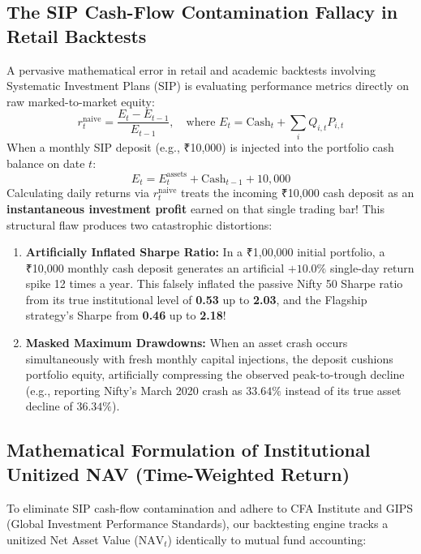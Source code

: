 \documentclass[11pt,a4paper]{article}
\begin{document}
\subsection{The SIP Cash-Flow Contamination Fallacy in Retail Backtests}
A pervasive mathematical error in retail and academic backtests involving Systematic Investment Plans (SIP) is evaluating performance metrics directly on raw marked-to-market equity:
\begin{equation}
r_t^{\text{naive}} = \frac{E_t - E_{t-1}}{E_{t-1}}, \quad \text{where } E_t = \text{Cash}_t + \sum_{i} Q_{i, t} P_{i, t}
\end{equation}
When a monthly SIP deposit (e.g., ₹10,000) is injected into the portfolio cash balance on date $t$:
\begin{equation}
E_t = E_t^{\text{assets}} + \text{Cash}_{t-1} + 10,000
\end{equation}
Calculating daily returns via $r_t^{\text{naive}}$ treats the incoming ₹10,000 cash deposit as an \textbf{instantaneous investment profit} earned on that single trading bar!
This structural flaw produces two catastrophic distortions:
\begin{enumerate}[leftmargin=*]
    \item \textbf{Artificially Inflated Sharpe Ratio:} In a ₹1,00,000 initial portfolio, a ₹10,000 monthly cash deposit generates an artificial $+10.0\%$ single-day return spike 12 times a year. This falsely inflated the passive Nifty 50 Sharpe ratio from its true institutional level of \textbf{0.53} up to \textbf{2.03}, and the Flagship strategy's Sharpe from \textbf{0.46} up to \textbf{2.18}!
    \item \textbf{Masked Maximum Drawdowns:} When an asset crash occurs simultaneously with fresh monthly capital injections, the deposit cushions portfolio equity, artificially compressing the observed peak-to-trough decline (e.g., reporting Nifty's March 2020 crash as $33.64\%$ instead of its true asset decline of $36.34\%$).
\end{enumerate}

\subsection{Mathematical Formulation of Institutional Unitized NAV (Time-Weighted Return)}
To eliminate SIP cash-flow contamination and adhere to CFA Institute and GIPS (Global Investment Performance Standards), our backtesting engine tracks a unitized Net Asset Value ($\text{NAV}_t$) identically to mutual fund accounting:
\end{document}
